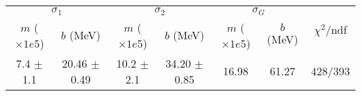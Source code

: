 \begin{tabular}{cc|cc|cc||c}
\multicolumn{2}{c|}{$\sigma_1$} & \multicolumn{2}{|c}{$\sigma_2$} & \multicolumn{2}{|c}{$\sigma_G$}  & \multirow{2}{*}{$\chi^2/$ndf}\\
$m$ ($\times1e5$) & $b$ (MeV) & $m$ ($\times1e5$) & $b$ (MeV) & $m$ ($\times1e5$) & $b$ (MeV) & \\
\hline
7.4 $\pm$ 1.1 & 20.46 $\pm$ 0.49 & 10.2 $\pm$ 2.1 & 34.20 $\pm$ 0.85 & 16.98 & 61.27 & 428/393\\
\end{tabular}
